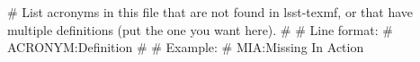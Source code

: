 # List acronyms in this file that are not found in lsst-texmf, or that have multiple definitions (put the one you want here).
#
# Line format:
#   ACRONYM:Definition
#
# Example:
#   MIA:Missing In Action